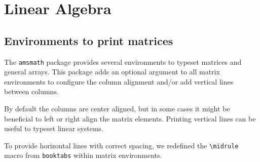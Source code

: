 \documentclass[DIV=13]{scrartcl}
\begin{document}
\section{Linear Algebra}
\subsection{Environments to print matrices}
The \verb|amsmath| package provides several environments to typeset matrices
and general arrays. This package adds an optional argument to
all matrix environments to configure the column alignment and/or add
vertical lines between columns.

By default the columns are center aligned, but in some cases it might be
beneficial to left or right align the matrix elements. Printing vertical
lines can be useful to typeset linear systems.

To provide horizontal lines with correct spacing, we redefined the
\verb|\midrule| macro from \texttt{booktabs} within matrix environments.
\end{document}
